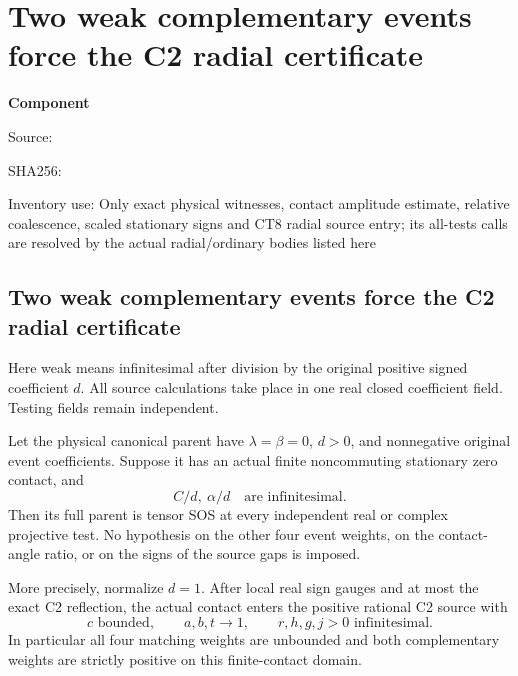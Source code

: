\chapter{Two weak complementary events force the C2 radial certificate}
\label{component:p534f57e1da6f}
\noindent\textbf{Component }\par
{\small\noindent Source: \par}
{\small\noindent SHA256: \par}
{\small\noindent Inventory use: Only exact physical witnesses, contact amplitude estimate, relative coalescence, scaled stationary signs and CT8 radial source entry; its all-tests calls are resolved by the actual radial/ordinary bodies listed here\par}
\medskip
\section{Two weak complementary events force the C2 radial certificate}
\label{p534f57e1da6f:sec:chart-free-c2}

Here weak means infinitesimal after division by the original positive
signed coefficient \(d\). All source calculations take place in one real
closed coefficient field. Testing fields remain independent.

\begin{theorem}
\label{p534f57e1da6f:thm:chart-free-c2}
Let the physical canonical parent have \(\lambda=\beta=0\), \(d>0\),
and nonnegative original event coefficients. Suppose it has an actual
finite noncommuting stationary zero contact, and
\[
                    C/d,\ \alpha/d\quad\text{are infinitesimal}.
\]
Then its full parent is tensor SOS at every independent real or complex
projective test. No hypothesis on the other four event weights, on the
contact-angle ratio, or on the signs of the source gaps is imposed.

More precisely, normalize \(d=1\). After local real sign gauges and at
most the exact C2 reflection,
the actual contact enters the positive rational C2 source with
\[
 c\text{ bounded},\qquad a,b,t\longrightarrow1,\qquad
 r,h,g,j>0\text{ infinitesimal}.
\]
In particular all four matching weights are unbounded and both
complementary weights are strictly positive on this finite-contact domain.
\end{theorem}

